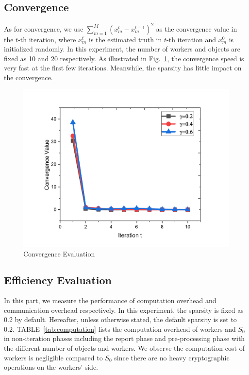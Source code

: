 \documentclass[conference]{IEEEtran}
\begin{document}
\subsection{Convergence}
As for convergence, we use $\sum_{m=1}^M (x_m^t - x_m^{t-1})^2$ as the convergence value in the $t$-th iteration, where $x_m^t$ is the estimated truth in $t$-th iteration and $x_m^0$ is initialized randomly.
In this experiment, the number of workers and objects are fixed as 10 and 20 respectively.
As illustrated in Fig.~\ref{fig:conver}, the convergence speed is very fast at the first few iterations.
Meanwhile, the sparsity has little impact on the convergence.
\begin{figure}[htbp]
  \centering
  \includegraphics[width=0.75\linewidth]{figures/conver.pdf}
  \caption{Convergence Evaluation}
  \label{fig:conver}
\end{figure}

\subsection{Efficiency Evaluation}
In this part, we measure the performance of computation overhead and communication overhead respectively.
In this experiment, the sparsity is fixed as 0.2 by default.
Hereafter, unless otherwise stated, the default sparsity is set to 0.2.
TABLE~\ref{tab:computation} lists the computation overhead of workers and $S_0$ in non-iteration phases including the report phase and pre-processing phase with the different number of objects and workers.
We observe the computation cost of workers is negligible compared to $S_0$ since there are no heavy cryptographic operations on the workers' side.
\end{document}
